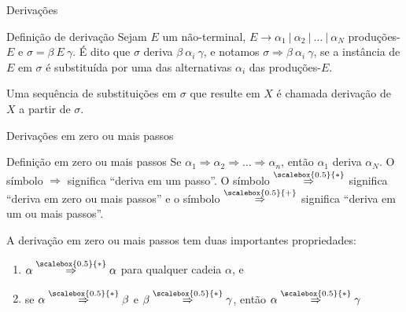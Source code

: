 \begin{frame}[fragile]{Derivações}

    \begin{block}{Definição de derivação}
        Sejam $E$ um não-terminal, $E\to \alpha_1\ |\ \alpha_2\ |\ \ldots \ |\ \alpha_N$ produções-$E$ e $\sigma = \beta\ E\ \gamma$. É dito que $\sigma$ deriva 
            $\beta\ \alpha_i\ \gamma$, e notamos $\sigma \Rightarrow \beta\ \alpha_i\ \gamma$, se a instância de $E$ em $\sigma$ é substituída por uma
            das alternativas $\alpha_i$ das produções-$E$.

        \vspace{0.1in}

        Uma sequência de substituições em $\sigma$ que resulte em $X$ é chamada derivação de $X$ a partir de $\sigma$.
    \end{block}

\end{frame}

\begin{frame}[fragile]{Derivações em zero ou mais passos}

    \begin{block}{Definição em zero ou mais passos}
        Se $\alpha_1 \Rightarrow \alpha_2 \Rightarrow \ldots \Rightarrow \alpha_n$, então $\alpha_1$ deriva $\alpha_N$. O símbolo $\Rightarrow$ significa
        ``deriva em um passo''. O símbolo $\overset{\scalebox{0.5}{*}}{\Rightarrow}$ significa ``deriva em zero ou mais passos'' e o símbolo  $\overset{\scalebox{0.5}{+}}{\Rightarrow}$ significa
        ``deriva em um ou mais passos''.
    
        \vspace{0.1in}

        A derivação em zero ou mais passos tem duas importantes propriedades:
        \begin{enumerate}
            \item $\alpha \overset{\scalebox{0.5}{*}}{\Rightarrow} \alpha$ para qualquer cadeia $\alpha$, e
            \item se $\alpha \overset{\scalebox{0.5}{*}}{\Rightarrow} \beta$ e $\beta \overset{\scalebox{0.5}{*}}{\Rightarrow} \gamma$, então $\alpha \overset{\scalebox{0.5}{*}}{\Rightarrow} \gamma$ 
        \end{enumerate}
    \end{block}

\end{frame}

